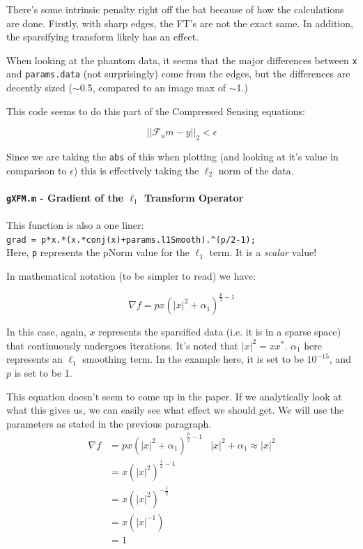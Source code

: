 \documentclass[11 pt]{article}
\newcommand{\bo}{\noindent\textbf}
\begin{document}
            There's some intrinsic penalty right off the bat because of how the calculations are done. Firstly, with sharp edges, the FT's are not the exact same. In addition, the sparsifying transform likely has an effect.

            When looking at the phantom data, it seems that the major differences between \texttt{x} and \texttt{params.data} (not surprisingly) come from the edges, but the differences are decently sized ($\sim$0.5, compared to an image max of $\sim$1.)

            This code seems to do this part of the Compressed Sensing equations:

            \[ \left|\left| \mathcal{F}_u m - y \right|\right|_2 < \epsilon\]

            Since we are taking the \texttt{abs} of this when plotting (and looking at it's value in comparison to $\epsilon$) this is effectively taking the $\ell_2$ norm of the data.\\\\

          \bo{\texttt{gXFM.m} - Gradient of the $\ell_1$ Transform Operator}
            \hfill\\\\
            \noindent This function is also a one liner:\\

            \verb!grad = p*x.*(x.*conj(x)+params.l1Smooth).^(p/2-1);!\\

            \noindent Here, \texttt{p} represents the pNorm value for the $\ell_1$ term. It is a \emph{scalar} value!

            \noindent In mathematical notation (to be simpler to read) we have:

            \[ \nabla f = p x (|x|^2 + \alpha_1)^{\frac{p}{2} - 1}\]

            In this case, again, $x$ represents the sparsified data (i.e. it is in a sparse space) that continuously undergoes iterations. It's noted that $|x|^2 = x x^*$. $\alpha_1$ here represents an $\ell_1$ smoothing term. In the example here, it is set to be $10^{-15}$, and $p$ is set to be 1. 

            This equation doesn't seem to come up in the paper. If we analytically look at what this gives us, we can easily see what effect we should get. We will use the parameters as stated in the previous paragraph.
            \begin{align*}
              \nabla f &= p x (|x|^2 + \alpha_1)^{\frac{p}{2} - 1} & |x|^2 + \alpha_1 \approx |x|^2\\
                       &= x(|x|^2)^{\frac{1}{2} - 1}\\
                       &= x(|x|^2)^{-\frac{1}{2}}\\
                       &= x(|x|^{-1})\\
                       &= 1
              \end{align*}
\end{document}

